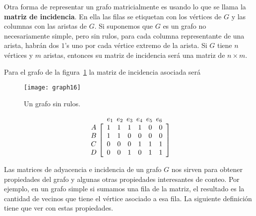 Otra forma de representar un grafo matricialmente es usando lo que se llama la {\bf matriz de incidencia}.
En ella las filas se etiquetan con los vértices de $G$ y las columnas con las aristas de $G$.
Si suponemos que $G$ es un grafo no necesariamente simple, pero sin rulos, para cada columna representante de una arista, habrán dos $1$'s uno por cada vértice extremo de la arista.
Si $G$ tiene $n$ vértices y $m$ aristas, entonces su matriz de incidencia será una matriz de $n\times m$.

\begin{ejemplo}
Para el grafo de la figura~\ref{fig:graph16} la matriz de incidencia asociada será
\begin{figure}
\centering
\texttt{[image: graph16]}
\caption{Un grafo sin rulos.}
\label{fig:graph16}
\end{figure}
\[
\begin{array}{cc}
& \hspace*{-1.2em}
\begin{array}{ccccccccccc}
e_1\hspace*{-0.5em}&e_2\hspace*{-0.5em}&e_3\hspace*{-0.5em}&e_4\hspace*{-0.5em}&e_5\hspace*{-0.5em}&e_6
\end{array}\\
\begin{array}{c}
A\\
B\\
C\\
D
\end{array}
& \hspace*{-1.2em}
\left[
\begin{array}{ccccccccccccc}
1&1&1&1&0&0\\
1&1&0&0&0&0\\
0&0&0&1&1&1\\
0&0&1&0&1&1
\end{array}
\right]
\end{array}
\]
\end{ejemplo}

Las matrices de adyacencia e incidencia de un grafo $G$ nos sirven para obtener propiedades del grafo y algunas otras propiedades interesantes de conteo. 
Por ejemplo, en un grafo simple si sumamos una fila de la matriz, el resultado es la cantidad de vecinos que tiene el vértice asociado a esa fila.
La siguiente definición tiene que ver con estas propiedades.

